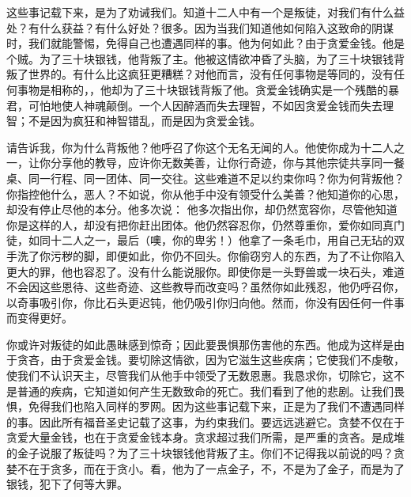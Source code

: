 这些事记载下来，是为了劝诫我们。知道十二人中有一个是叛徒，对我们有什么益处？有什么获益？有什么好处？很多。因为当我们知道他如何陷入这致命的阴谋时，我们就能警惕，免得自己也遭遇同样的事。他为何如此？由于贪爱金钱。他是个贼。为了三十块银钱，他背叛了主。他被这情欲冲昏了头脑，为了三十块银钱背叛了世界的。有什么比这疯狂更糟糕？对他而言，没有任何事物是等同的，没有任何事物是相称的，，他却为了三十块银钱背叛了他。贪爱金钱确实是一个残酷的暴君，可怕地使人神魂颠倒。一个人因醉酒而失去理智，不如因贪爱金钱而失去理智；不是因为疯狂和神智错乱，而是因为贪爱金钱。\par

请告诉我，你为什么背叛他？他呼召了你这个无名无闻的人。他使你成为十二人之一，让你分享他的教导，应许你无数美善，让你行奇迹，你与其他宗徒共享同一餐桌、同一行程、同一团体、同一交往。这些难道不足以约束你吗？你为何背叛他？你指控他什么，恶人？不如说，你从他手中没有领受什么美善？他知道你的心思，却没有停止尽他的本分。他多次说： 他多次指出你，却仍然宽容你，尽管他知道你是这样的人，却没有把你赶出团体。他仍然容忍你，仍然尊重你，爱你如同真门徒，如同十二人之一，最后（噢，你的卑劣！）他拿了一条毛巾，用自己无玷的双手洗了你污秽的脚，即便如此，你仍不回头。你偷窃穷人的东西，为了不让你陷入更大的罪，他也容忍了。没有什么能说服你。即使你是一头野兽或一块石头，难道不会因这些恩待、这些奇迹、这些教导而改变吗？虽然你如此残忍，他仍呼召你，以奇事吸引你，你比石头更迟钝，他仍吸引你归向他。然而，你没有因任何一件事而变得更好。\par

你或许对叛徒的如此愚昧感到惊奇；因此要畏惧那伤害他的东西。他成为这样是由于贪吝，由于贪爱金钱。要切除这情欲，因为它滋生这些疾病；它使我们不虔敬，使我们不认识天主，尽管我们从他手中领受了无数恩惠。我恳求你，切除它，这不是普通的疾病，它知道如何产生无数致命的死亡。我们看到了他的悲剧。让我们畏惧，免得我们也陷入同样的罗网。因为这些事记载下来，正是为了我们不遭遇同样的事。因此所有福音圣史记载了这事，为约束我们。要远远逃避它。贪婪不仅在于贪爱大量金钱，也在于贪爱金钱本身。贪求超过我们所需，是严重的贪吝。是成堆的金子说服了叛徒吗？为了三十块银钱他背叛了主。你们不记得我以前说的吗？贪婪不在于贪多，而在于贪小。看，他为了一点金子，不，不是为了金子，而是为了银钱，犯下了何等大罪。\par

